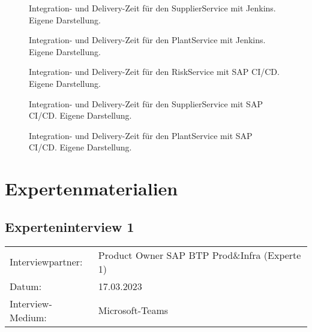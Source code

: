 \begin{center}
	\begin{figure}[H]
		\centering
		\caption[]{Integration- und Delivery-Zeit für den SupplierService mit Jenkins. Eigene Darstellung.}
		\label{fig:JP_Supplier}
	\end{figure}
\end{center}
\begin{center}
	\begin{figure}[H]
		\centering
		\caption[]{Integration- und Delivery-Zeit für den PlantService mit Jenkins. Eigene Darstellung.}
		\label{fig:JP_Plant}
	\end{figure}
\end{center}
\begin{center}
	\begin{figure}[H]
		\centering
		\caption[]{Integration- und Delivery-Zeit für den RiskService mit SAP CI/CD. Eigene Darstellung.}
		\label{fig:SP_Risk}
	\end{figure}
\end{center}

\begin{center}
	\begin{figure}[H]
		\centering
		\caption[]{Integration- und Delivery-Zeit für den SupplierService mit SAP CI/CD. Eigene Darstellung.}
		\label{fig:SP_Supplier}
	\end{figure}
\end{center}
\begin{center}
	\begin{figure}[H]
		\centering
		\caption[]{Integration- und Delivery-Zeit für den PlantService mit SAP CI/CD. Eigene Darstellung.}
		\label{fig:SP_Plant}
	\end{figure}
\end{center}
\newpage
\section{Expertenmaterialien}
\label{sec:Expertenmaterialien}
\newpage

\subsection{Experteninterview 1}
	\begin{tabular}{ l l }
		Interviewpartner: & Product Owner SAP BTP Prod\&Infra (Experte 1)\\
		Datum: & 17.03.2023\\
		Interview-Medium: & Microsoft-Teams\\
\end{tabular}\\\\

